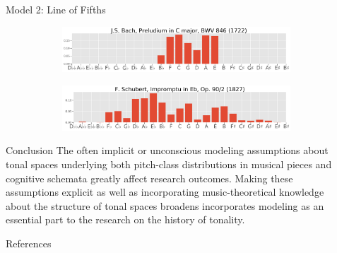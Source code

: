 \documentclass[final]{beamer}
\begin{document}
\begin{frame}[t]
\begin{minipage}[t][.6\textheight][t]{\textwidth}
\begin{columns}[t]
\begin{column}{0.3\textwidth}
\begin{block}{Model 2: Line of Fifths}
\begin{figure}
				\vspace{1em} %

				\begin{subfigure}{\textwidth} %
					\includegraphics[width=\textwidth]{img/gmm_bach.png}
				\end{subfigure}

				\vspace{1em} %

				\begin{subfigure}{\textwidth} %
					\includegraphics[width=\textwidth]{img/gmm_schubert.png}
				\end{subfigure}
			\end{figure}
      \end{block}

			\begin{block}{Conclusion}
        The often implicit or unconscious \alert{modeling assumptions about tonal spaces}
        underlying both pitch-class distributions in musical pieces and cognitive schemata
        greatly affect research outcomes. Making these assumptions explicit
        as well as incorporating music-theoretical knowledge about the
        structure of tonal spaces broadens incorporates modeling as an essential part
        to the research on the history of tonality.
      \end{block}

			\begin{block}{References}
          \printbibliography
      \end{block}


    \end{column}

    \begin{column}{0.3\textwidth}


\end{column}
\end{columns}
\end{minipage}
\end{frame}
\end{document}

